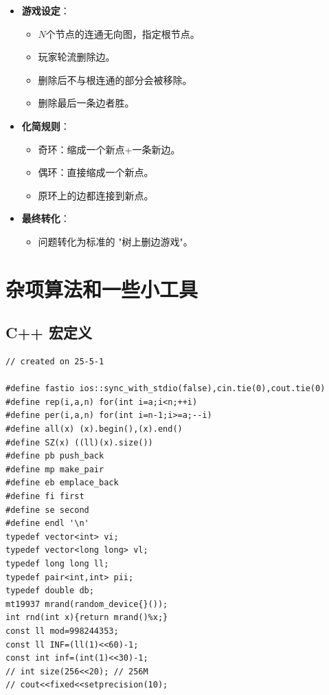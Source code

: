 \documentclass[a4paper,12pt]{article}
\begin{document}
\begin{itemize}
    \item \textbf{游戏设定}：
    \begin{itemize}
        \item $N$个节点的连通无向图，指定根节点。
        \item 玩家轮流删除边。
        \item 删除后不与根连通的部分会被移除。
        \item 删除最后一条边者胜。
    \end{itemize}

    \item \textbf{化简规则}：
    \begin{itemize}
        \item 奇环：缩成一个新点+一条新边。
        \item 偶环：直接缩成一个新点。
        \item 原环上的边都连接到新点。
    \end{itemize}

    \item \textbf{最终转化}：
    \begin{itemize}

        \item 问题转化为标准的 "树上删边游戏"。
    \end{itemize}
\end{itemize}
\newpage

\section{杂项算法和一些小工具}

\subsection{C++ 宏定义}

\begin{lstlisting}
// created on 25-5-1

#define fastio ios::sync_with_stdio(false),cin.tie(0),cout.tie(0)
#define rep(i,a,n) for(int i=a;i<n;++i)
#define per(i,a,n) for(int i=n-1;i>=a;--i)
#define all(x) (x).begin(),(x).end()
#define SZ(x) ((ll)(x).size())
#define pb push_back
#define mp make_pair
#define eb emplace_back
#define fi first
#define se second
#define endl '\n'
typedef vector<int> vi;
typedef vector<long long> vl;
typedef long long ll;
typedef pair<int,int> pii;
typedef double db;
mt19937 mrand(random_device{}());
int rnd(int x){return mrand()%x;}
const ll mod=998244353;
const ll INF=(ll(1)<<60)-1;
const int inf=(int(1)<<30)-1;
// int size(256<<20); // 256M
// cout<<fixed<<setprecision(10);
\end{lstlisting}
\end{document}
